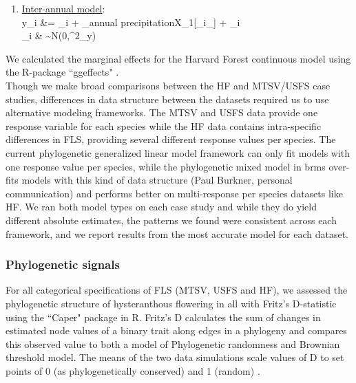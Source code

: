 \documentclass{article}\usepackage[]{graphicx}\usepackage[]{color}
\begin{document}
{\begin{enumerate}
\epsilon_i & \sim N(0,\sigma^2_y) \\ %


\noindent The effect of the phylogeny was model as above and here, the individual effects within species were modeled:\\
\alpha_{ind/sp} & \sim N(\mu_{\alpha}, \sigma^2_{ind/sp}) \\

\item \underline{Inter-annual model}:\\
y_i &= \alpha_{i} + \beta_{annual precipitation}X_1[_i_] + \epsilon_i\\
\epsilon_i & \sim N(0,\sigma^2_y) \\

\end{enumerate}
\indent We calculated the marginal effects for the Harvard Forest continuous model using the R-package ``ggeffects" \citep{Ludecke2018}.\\

\noindent Though we make broad comparisons between the HF and MTSV/USFS case studies, differences in data structure between the datasets required us to use alternative modeling frameworks. The MTSV and USFS data provide one response variable for each species while the HF data contains intra-specific differences in FLS, providing several different response values per species. The current phylogenetic generalized linear model framework can only fit models with one response value per species, while the phylogenetic mixed model in brms over-fits models with this kind of data structure (Paul Burkner, personal communication) and performs better on multi-response per species datasets like HF. We ran both model types on each case study and while they do yield different absolute estimates, the patterns we found were consistent across each framework, and we report results from the most accurate model for each dataset.\\

\subsubsection*{Phylogenetic signals}
For all categorical specifications of FLS (MTSV, USFS and HF), we assessed the phylogenetic structure of hysteranthous flowering in all  with Fritz's D-statistic \citep{FRITZ2010} using the ``Caper" package \citep{Orme2013} in R. Fritz's D calculates the sum of changes in estimated node values of a binary trait along edges in a phylogeny and compares this observed value to both a model of Phylogenetic randomness and Brownian threshold model. The means of the two data simulations scale values of D to set points of 0 (as phylogenetically conserved) and 1 (random)  \citep{Orme2013}.\\

}
\end{document}
